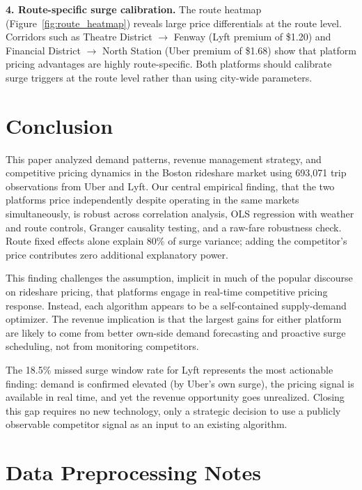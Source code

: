 \documentclass[11pt, letterpaper]{article}
\begin{document}
\textbf{4. Route-specific surge calibration.}
The route heatmap (Figure~\ref{fig:route_heatmap}) reveals large
price differentials at the route level. Corridors such as
Theatre District $\to$ Fenway (Lyft premium of \$1.20) and
Financial District $\to$ North Station (Uber premium of \$1.68)
show that platform pricing advantages are highly route-specific.
Both platforms should calibrate surge triggers at the route level
rather than using city-wide parameters.

\section{Conclusion}

This paper analyzed demand patterns, revenue management strategy, and
competitive pricing dynamics in the Boston rideshare market using 693,071
trip observations from Uber and Lyft. Our central empirical finding, that the two platforms price independently despite operating in the same
markets simultaneously, is robust across correlation analysis,
OLS regression with weather and route controls, Granger causality testing,
and a raw-fare robustness check. Route fixed effects alone explain 80\%
of surge variance; adding the competitor's price contributes zero
additional explanatory power.

This finding challenges the assumption, implicit in much of the popular
discourse on rideshare pricing, that platforms engage in real-time
competitive pricing response. Instead, each algorithm appears to be a
self-contained supply-demand optimizer. The revenue implication is that
the largest gains for either platform are likely to come from better
own-side demand forecasting and proactive surge scheduling, not from
monitoring competitors.

The 18.5\% missed surge window rate for Lyft represents the most
actionable finding: demand is confirmed elevated (by Uber's own surge),
the pricing signal is available in real time, and yet the revenue
opportunity goes unrealized. Closing this gap requires no new technology, only a strategic decision to use a publicly observable competitor
signal as an input to an existing algorithm.

\appendix
\section{Data Preprocessing Notes}
\end{document}
